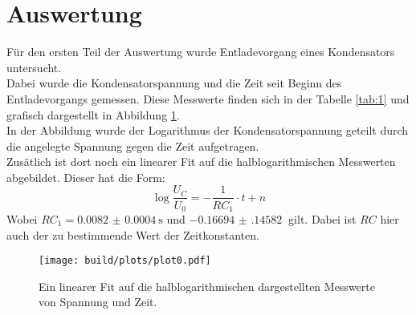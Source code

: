 \newpage
\section{Auswertung}
Für den ersten Teil der Auswertung wurde Entladevorgang eines Kondensators untersucht.\\
Dabei wurde die Kondensatorspannung und die Zeit seit Beginn des Entladevorgangs gemessen.
Diese Messwerte finden sich in der Tabelle \ref{tab:1} und grafisch dargestellt in Abbildung \ref{img:1}.\\
In der Abbildung wurde der Logarithmus der Kondensatorspannung geteilt durch die angelegte Spannung gegen die Zeit aufgetragen.\\
Zusätlich ist dort noch ein linearer Fit auf die halblogarithmischen Messwerten abgebildet. Dieser hat die Form:
\begin{equation*}
    \log{\frac{U_C}{U_0}}= -\frac{1}{RC_1}\cdot t +n
\end{equation*}
Wobei $RC_1= \SI{0.0082(4)}{\second}$ und $\SI{-0.16694(14582)}{}$ gilt. Dabei ist $RC$ hier auch der zu bestimmende Wert der Zeitkonstanten.

\begin{figure}[h]
    \centering
    \texttt{[image: build/plots/plot0.pdf]}
    \caption{Ein linearer Fit auf die halblogarithmischen dargestellten Messwerte von Spannung und Zeit.}
    \label{img:1}
\end{figure}

